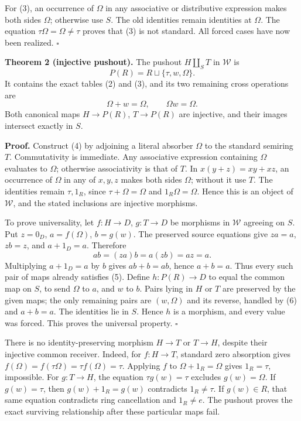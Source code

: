 \documentclass[
]{article}
\begin{document}
For (3), an occurrence of \(\Omega\) in any associative or distributive
expression makes both sides \(\Omega\); otherwise use \(S\). The old
identities remain identities at \(\Omega\). The equation
\(\tau\Omega=\Omega\ne\tau\) proves that (3) is not standard. All forced
cases have now been realized. \(\square\)

\textbf{Theorem 2 (injective pushout).} The pushout \(H\amalg_S T\) in
\(\mathcal W\) is \[
P(R)=R\sqcup\{\tau,w,\Omega\}.
\tag{4}
\] It contains the exact tables (2) and (3), and its two remaining cross
operations are \[
\boxed{\Omega+w=\Omega,\qquad \Omega w=\Omega.}
\tag{5}
\] Both canonical maps \(H\to P(R)\), \(T\to P(R)\) are injective, and
their images intersect exactly in \(S\).

\textbf{Proof.} Construct (4) by adjoining a literal absorber \(\Omega\)
to the standard semiring \(T\). Commutativity is immediate. Any
associative expression containing \(\Omega\) evaluates to \(\Omega\);
otherwise associativity is that of \(T\). In \(x(y+z)=xy+xz\), an
occurrence of \(\Omega\) in any of \(x,y,z\) makes both sides
\(\Omega\); without it use \(T\). The identities remain \(\tau,1_R\),
since \(\tau+\Omega=\Omega\) and \(1_R\Omega=\Omega\). Hence this is an
object of \(\mathcal W\), and the stated inclusions are injective
morphisms.

To prove universality, let \(f:H\to D\), \(g:T\to D\) be morphisms in
\(\mathcal W\) agreeing on \(S\). Put \(z=0_D\), \(a=f(\Omega)\),
\(b=g(w)\). The preserved source equations give \(za=a\), \(zb=z\), and
\(a+1_D=a\). Therefore \[
ab=(za)b=a(zb)=az=a.
\tag{6}
\] Multiplying \(a+1_D=a\) by \(b\) gives \(ab+b=ab\), hence \(a+b=a\).
Thus every such pair of maps already satisfies (5). Define
\(h:P(R)\to D\) to equal the common map on \(S\), to send \(\Omega\) to
\(a\), and \(w\) to \(b\). Pairs lying in \(H\) or \(T\) are preserved
by the given maps; the only remaining pairs are \((w,\Omega)\) and its
reverse, handled by (6) and \(a+b=a\). The identities lie in \(S\).
Hence \(h\) is a morphism, and every value was forced. This proves the
universal property. \(\square\)

There is no identity-preserving morphism \(H\to T\) or \(T\to H\),
despite their injective common receiver. Indeed, for \(f:H\to T\),
standard zero absorption gives
\(f(\Omega)=f(\tau\Omega)=\tau f(\Omega)=\tau\). Applying \(f\) to
\(\Omega+1_R=\Omega\) gives \(1_R=\tau\), impossible. For \(g:T\to H\),
the equation \(\tau g(w)=\tau\) excludes \(g(w)=\Omega\). If
\(g(w)=\tau\), then \(g(w)+1_R=g(w)\) contradicts \(1_R\ne\tau\). If
\(g(w)\in R\), that same equation contradicts ring cancellation and
\(1_R\ne e\). The pushout proves the exact surviving relationship after
these particular maps fail.
\end{document}
